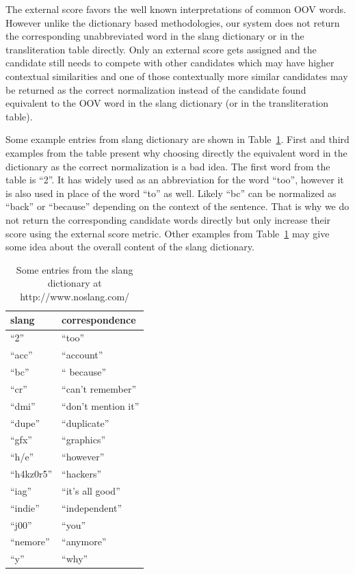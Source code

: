 \documentclass[a4paper,onesided,12pt]{report}
\begin{document}
The external score favors the well known interpretations of common OOV words. However unlike the dictionary based methodologies, our system does not return the corresponding unabbreviated word in the slang dictionary or in the transliteration table directly. Only an external score gets assigned and the candidate still needs to compete with other candidates which may have higher contextual similarities and one of those contextually more similar candidates may be returned as the correct normalization instead of the candidate found equivalent to the OOV word in the slang dictionary (or in the transliteration table).

Some example entries from slang dictionary are shown in Table~\ref{tab:slang}. First and third examples from the table present why choosing directly the equivalent word in the dictionary as the correct normalization is a bad idea. The first word from the table is ``2''. It has widely used as an abbreviation for the word ``too'', however it is also used in place of the word ``to'' as well. Likely ``bc'' can be normalized as ``back'' or ``because'' depending on the context of the sentence. That is why we do not return the corresponding candidate words directly but only increase their score using the external score metric. Other examples from Table~\ref{tab:slang} may give some idea about the overall content of the slang dictionary.

\begin{table}[ht]
  \caption{Some entries from the slang dictionary at http://www.noslang.com/}
  \centering
    \begin{tabular}[l]{|l|l|}
    \hline
    \textbf{slang} & \textbf{correspondence} \\\hline
    ``2'' & ``too'' \\\hline
    ``acc'' & ``account'' \\\hline
    ``bc'' & `` because'' \\\hline
    ``cr'' & ``can't remember'' \\\hline
    ``dmi'' & ``don't mention it'' \\\hline
    ``dupe'' & ``duplicate'' \\\hline
    ``gfx'' & ``graphics'' \\\hline
    ``h/e'' & ``however'' \\\hline
    ``h4kz0r5'' & ``hackers'' \\\hline
    ``iag'' & ``it's all good'' \\\hline
    ``indie''  & ``independent'' \\\hline
    ``j00'' & ``you'' \\\hline
    ``nemore'' & ``anymore''  \\\hline
    ``y'' & ``why'' \\\hline
  \end{tabular}
\label{tab:slang}
\end{table}
\end{document}
